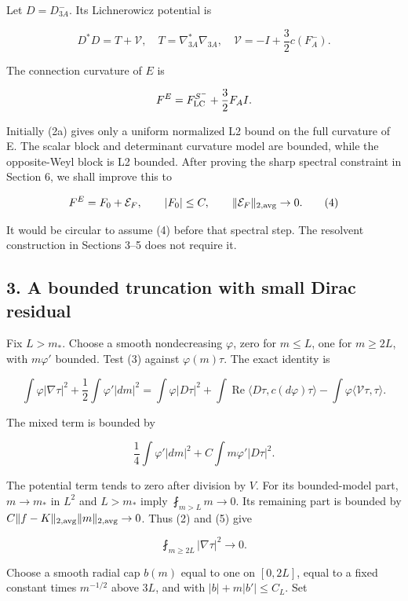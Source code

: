 Let \(D=D^-_{3A}\). Its Lichnerowicz potential is

\[
 D^*D=T+\mathcal V,\quad
 T=\nabla_{3A}^*\nabla_{3A},\quad
 \mathcal V=-I+\frac32c(F_A^-).
\tag{3}
\]

The connection curvature of \(E\) is

\[
 F^E=F^{S^-}_{\rm LC}+\frac32F_A I.
\]

Initially (2a) gives only a uniform normalized L2 bound on the full
curvature of E. The scalar block and determinant curvature model are
bounded, while the opposite-Weyl block is L2 bounded. After proving the
sharp spectral constraint in Section 6, we shall improve this to

\[
 F^E=F_0+\mathcal E_F,\qquad |F_0|\le C,
 \qquad\|\mathcal E_F\|_{2,\rm avg}\to0.
\tag{4}
\]

It would be circular to assume (4) before that spectral step. The
resolvent construction in Sections 3--5 does not require it.

\hypertarget{o10strength:a-bounded-truncation-with-small-dirac-residual}{%
\subsection{3. A bounded truncation with small Dirac
residual}\label{o10strength:a-bounded-truncation-with-small-dirac-residual}}

Fix \(L>m_*\). Choose a smooth nondecreasing \(\varphi\), zero for
\(m\le L\), one for \(m\ge2L\), with \(m\varphi'\) bounded. Test (3)
against \(\varphi(m)\tau\). The exact identity is

\[
 \int\varphi|\nabla\tau|^2+
 \frac12\int\varphi'|dm|^2
 =\int\varphi|D\tau|^2+
 \int\operatorname{Re}\langle D\tau,c(d\varphi)\tau\rangle
 -\int\varphi\langle\mathcal V\tau,\tau\rangle.
\tag{5}
\]

The mixed term is bounded by

\[
 \frac14\int\varphi'|dm|^2+
 C\int m\varphi'|D\tau|^2.
\]

The potential term tends to zero after division by \(V\). For its
bounded-model part, \(m\to m_*\) in \(L^2\) and \(L>m_*\) imply
\(\fint_{m>L}m\to0\). Its remaining part is bounded by
\(C\|f-K\|_{2,\rm avg}\|m\|_{2,\rm avg}\to0\). Thus (2) and (5) give

\[
 \fint_{m\ge2L}|\nabla\tau|^2\longrightarrow0.
\tag{6}
\]

Choose a smooth radial cap \(b(m)\) equal to one on \([0,2L]\), equal to
a fixed constant times \(m^{-1/2}\) above \(3L\), and with
\(|b|+m|b'|\le C_L\). Set

